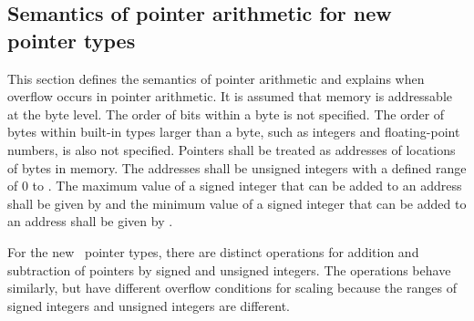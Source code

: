 \subsection{Semantics of pointer arithmetic for new pointer types}
\label{section:new-pointer-types-semantics}

This section defines the semantics of pointer arithmetic and explains
when overflow occurs in pointer arithmetic. It is assumed that memory is
addressable at the byte level. The order of bits within a byte is not
specified. The order of bytes within built-in types larger than a byte,
such as integers and floating-point numbers, is also not specified.
Pointers shall be treated as addresses of locations of bytes in memory.
The addresses shall be unsigned integers with a defined range of 0 to
. The maximum value of a signed integer that can be
added to an address shall be given by  and the
minimum value of a signed integer that can be added to an address shall
be given by .

For the new
\arrayptrT\ pointer
types, there are distinct operations for addition and subtraction of
pointers by signed and unsigned integers. The operations behave
similarly, but have different overflow conditions for scaling because
the ranges of signed integers and unsigned integers are different.

